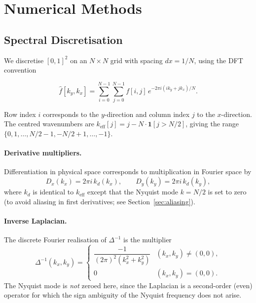 \documentclass[12pt,a4paper]{article}
\newcommand{\lapinv}{\Delta^{-1}}
\newcommand{\Dop}[1]{D_{#1}}
\theoremstyle{definition}
\theoremstyle{plain}
\begin{document}
\section{Numerical Methods}
\label{sec:numerics}

\subsection{Spectral Discretisation}

We discretise $[0,1]^2$ on an $N\times N$ grid with spacing $dx = 1/N$,
using the DFT convention

\begin{equation}
  \hat f[k_y,k_x]
  = \sum_{i=0}^{N-1}\sum_{j=0}^{N-1} f[i,j]\,e^{-2\pi i(ik_y+jk_x)/N}.
\end{equation}

Row index $i$ corresponds to the $y$-direction and column index $j$ to the
$x$-direction.
The centred wavenumbers are
$k_{\text{eff}}[j] = j - N\cdot\mathbf{1}[j>N/2]$,
giving the range $\{0,1,\ldots,N/2-1,-N/2+1,\ldots,-1\}$.

\paragraph{Derivative multipliers.}
Differentiation in physical space corresponds to multiplication in Fourier
space by
\begin{equation}
  \Dop{x}(k_x) = 2\pi i\,k_d(k_x),\qquad
  \Dop{y}(k_y) = 2\pi i\,k_d(k_y),
\end{equation}
where $k_d$ is identical to $k_{\text{eff}}$ except that the Nyquist mode
$k = N/2$ is set to zero (to avoid aliasing in first derivatives; see
Section~\ref{sec:aliasing}).

\paragraph{Inverse Laplacian.}
The discrete Fourier realisation of $\lapinv$ is the multiplier
\begin{equation}
  \lapinv(k_x,k_y)
  = \begin{cases}
      \dfrac{-1}{(2\pi)^2(k_x^2+k_y^2)} & (k_x,k_y)\neq(0,0),\\[6pt]
      0 & (k_x,k_y)=(0,0).
    \end{cases}
\end{equation}
The Nyquist mode is \emph{not} zeroed here, since the Laplacian is a
second-order (even) operator for which the sign ambiguity of the Nyquist
frequency does not arise.
\end{document}
